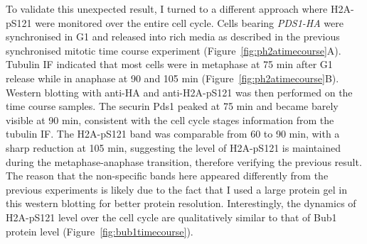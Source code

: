 To validate this unexpected result, I turned to a different approach where H2A-pS121 were monitored over the entire cell cycle. Cells bearing \textit{PDS1-HA} were synchronised in G1 and released into rich media as described in the previous synchronised mitotic time course experiment (Figure~\ref{fig:ph2atimecourse}A). Tubulin IF indicated that most cells were in metaphase at 75 \si{\minute} after G1 release while in anaphase at 90 and 105 \si{\minute} (Figure~\ref{fig:ph2atimecourse}B). Western blotting with anti-HA and anti-H2A-pS121 was then performed on the time course samples. The securin Pds1 peaked at 75 \si{\minute} and became barely visible at 90 \si{\minute}, consistent with the cell cycle stages information from the tubulin IF. The H2A-pS121 band was comparable from 60 to 90 \si{\minute}, with a sharp reduction at 105 \si{\minute}, suggesting the level of H2A-pS121 is maintained during the metaphase-anaphase transition, therefore verifying the previous result. The reason that the non-specific bands here appeared differently from the previous experiments is likely due to the fact that I used a large protein gel in this western blotting for better protein resolution. Interestingly, the dynamics of H2A-pS121 level over the cell cycle are qualitatively similar to that of Bub1 protein level (Figure~\ref{fig:bub1timecourse}). 

